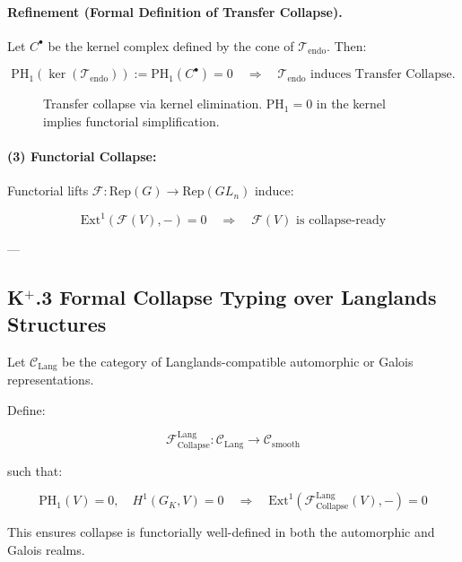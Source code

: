 \documentclass[11pt]{article}
\begin{document}
\paragraph{Refinement (Formal Definition of Transfer Collapse).}
Let \( C^\bullet \) be the kernel complex defined by the cone of \( \mathcal{T}_{\text{endo}} \). Then:

\[
\mathrm{PH}_1(\ker(\mathcal{T}_{\text{endo}})) := \mathrm{PH}_1(C^\bullet) = 0
\quad \Rightarrow \quad \mathcal{T}_{\text{endo}} \text{ induces Transfer Collapse}.
\]

\begin{figure}[h]
\centering
{}
\caption{Transfer collapse via kernel elimination. PH$_1 = 0$ in the kernel implies functorial simplification.}
\end{figure}

\paragraph{(3) Functorial Collapse:}
Functorial lifts \( \mathcal{F} : \mathrm{Rep}(G) \to \mathrm{Rep}(GL_n) \) induce:

\[
\mathrm{Ext}^1(\mathcal{F}(V), -) = 0 \quad \Rightarrow \quad \mathcal{F}(V) \text{ is collapse-ready}
\]


---

\subsection*{K$^{+}$.3 Formal Collapse Typing over Langlands Structures}

Let \( \mathcal{C}_{\mathrm{Lang}} \) be the category of Langlands-compatible automorphic or Galois representations.

Define:

\[
\mathcal{F}_{\mathrm{Collapse}}^{\mathrm{Lang}} : \mathcal{C}_{\mathrm{Lang}} \to \mathcal{C}_{\mathrm{smooth}}
\]

such that:

\[
\mathrm{PH}_1(V) = 0,\quad H^1(G_K, V) = 0 \quad \Rightarrow \quad \mathrm{Ext}^1(\mathcal{F}_{\mathrm{Collapse}}^{\mathrm{Lang}}(V), -) = 0
\]

This ensures collapse is functorially well-defined in both the automorphic and Galois realms.
\end{document}
